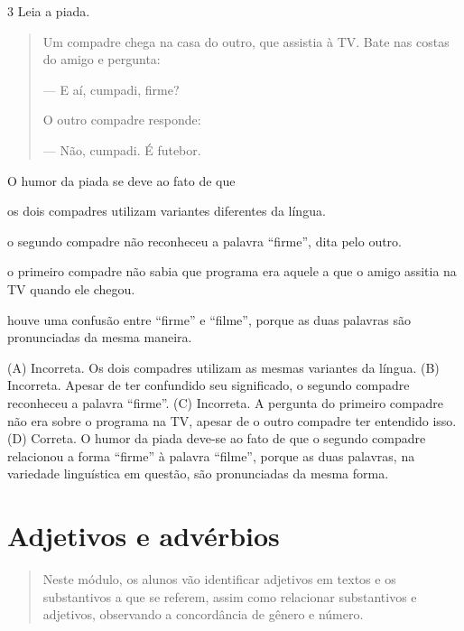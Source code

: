 \num{3} Leia a piada.

\begin{quote}
Um compadre chega na casa do outro, que assistia à TV. Bate nas costas do amigo e pergunta:

--- E aí, cumpadi, firme?

O outro compadre responde:

--- Não, cumpadi. É futebor.

\end{quote}

O humor da piada se deve ao fato de que

\begin{escolha}
\item os dois compadres utilizam variantes diferentes da língua.

\item o segundo compadre não reconheceu a palavra ``firme'', dita pelo outro.

\item o primeiro compadre não sabia que programa era aquele a que o amigo assitia na TV quando ele chegou.

\item houve uma confusão entre ``firme'' e ``filme'', porque as duas palavras são pronunciadas da mesma maneira.
\end{escolha}


(A) Incorreta. Os dois compadres utilizam as mesmas variantes da língua.
(B) Incorreta. Apesar de ter confundido seu significado, o segundo compadre reconheceu a palavra ``firme''.
(C) Incorreta. A pergunta do primeiro compadre não era sobre o programa na TV, apesar de o outro compadre ter entendido isso.
(D) Correta. O humor da piada deve-se ao fato de que o segundo compadre relacionou a forma ``firme'' à palavra ``filme'', porque as duas palavras, na variedade linguística em questão, são pronunciadas da mesma forma.

\chapter{Adjetivos e advérbios}

\begin{quote}
Neste módulo, os alunos vão identificar adjetivos em textos e os
substantivos a que se referem, assim como relacionar substantivos e
adjetivos, observando a concordância de gênero e número.
\end{quote}

